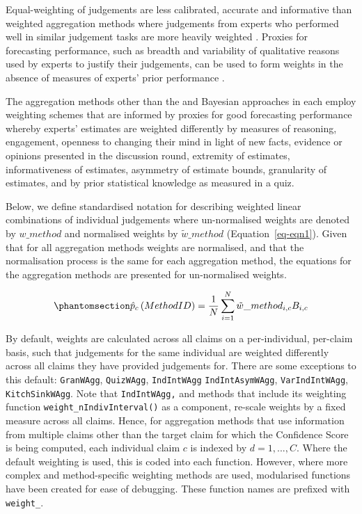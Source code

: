 \documentclass[article]{jss}
\newcommand{\fct}[1]{\code{#1()}}
\begin{document}
Equal-weighting of judgements are less calibrated, accurate and
informative than weighted aggregation methods where judgements from
experts who performed well in similar judgement tasks are more heavily
weighted \citep{Hanea2021}. Proxies for forecasting performance, such as
breadth and variability of qualitative reasons used by experts to
justify their judgements, can be used to form weights in the absence of
measures of experts' prior performance \citep{Hanea2021}.

The aggregation methods other than the \fct{AverageWAgg} and Bayesian
approaches in  each employ weighting schemes that are
informed by proxies for good forecasting performance whereby experts'
estimates are weighted differently by measures of reasoning, engagement,
openness to changing their mind in light of new facts, evidence or
opinions presented in the discussion round, extremity of estimates,
informativeness of estimates, asymmetry of estimate bounds, granularity
of estimates, and by prior statistical knowledge as measured in a quiz.

Below, we define standardised notation for describing weighted linear
combinations of individual judgements where un-normalised weights are
denoted by \(w\_method\) and normalised weights by
\(\tilde{w} \_ method\) (Equation~\ref{eq-eqn1}). Given that for all
aggregation methods weights are normalised, and that the normalisation
process is the same for each aggregation method, the equations for the
aggregation methods are presented for un-normalised weights.

\begin{equation}\protect\phantomsection\label{eq-eqn1}{
\hat{p}_c\left(Method \space ID \right) = \frac{1}{N}\sum_{i=1}^N \tilde{w}\_{method}_{i,c}  B_{i,c}
}\end{equation}

By default, weights are calculated across all claims on a
per-individual, per-claim basis, such that judgements for the same
individual are weighted differently across all claims they have provided
judgements for. There are some exceptions to this default:
\texttt{GranWAgg}, \texttt{QuizWAgg}, \texttt{IndIntWAgg}
\texttt{IndIntAsymWAgg}, \texttt{VarIndIntWAgg}, \texttt{KitchSinkWAgg}.
Note that \texttt{IndIntWAgg,} and methods that include its weighting
function \texttt{weight\_nIndivInterval()} as a component, re-scale
weights by a fixed measure across all claims. Hence, for aggregation
methods that use information from multiple claims other than the target
claim for which the Confidence Score is being computed, each individual
claim \(c\) is indexed by \(d = 1, ..., C\). Where the default weighting
is used, this is coded into each function. However, where more complex
and method-specific weighting methods are used, modularised functions
have been created for ease of debugging. These function names are
prefixed with \texttt{weight\_}.
\end{document}
